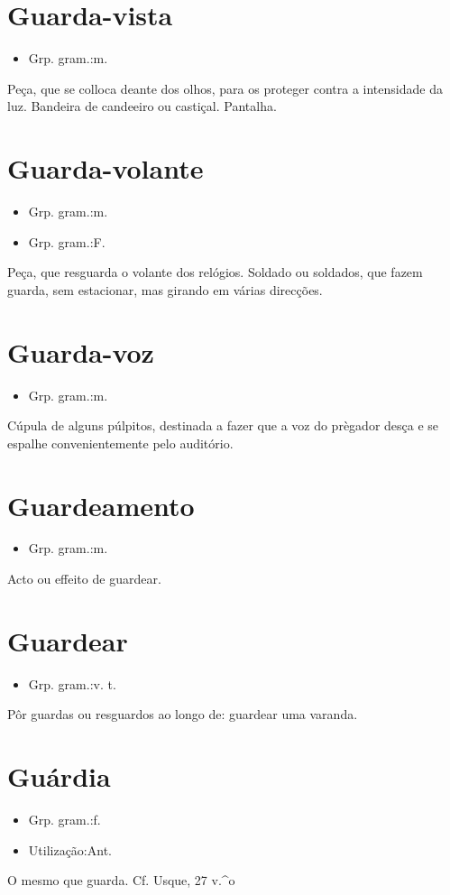 \section{Guarda-vista}
\begin{itemize}
\item {Grp. gram.:m.}
\end{itemize}
Peça, que se colloca deante dos olhos, para os proteger contra a intensidade da luz.
Bandeira de candeeiro ou castiçal.
Pantalha.
\section{Guarda-volante}
\begin{itemize}
\item {Grp. gram.:m.}
\end{itemize}
\begin{itemize}
\item {Grp. gram.:F.}
\end{itemize}
Peça, que resguarda o volante dos relógios.
Soldado ou soldados, que fazem guarda, sem estacionar, mas girando em várias direcções.
\section{Guarda-voz}
\begin{itemize}
\item {Grp. gram.:m.}
\end{itemize}
Cúpula de alguns púlpitos, destinada a fazer que a voz do prègador desça e se espalhe convenientemente pelo auditório.
\section{Guardeamento}
\begin{itemize}
\item {Grp. gram.:m.}
\end{itemize}
Acto ou effeito de guardear.
\section{Guardear}
\begin{itemize}
\item {Grp. gram.:v. t.}
\end{itemize}
Pôr guardas ou resguardos ao longo de: \textunderscore guardear uma varanda\textunderscore .
\section{Guárdia}
\begin{itemize}
\item {Grp. gram.:f.}
\end{itemize}
\begin{itemize}
\item {Utilização:Ant.}
\end{itemize}
O mesmo que \textunderscore guarda\textunderscore . Cf. Usque, 27 v.^o
